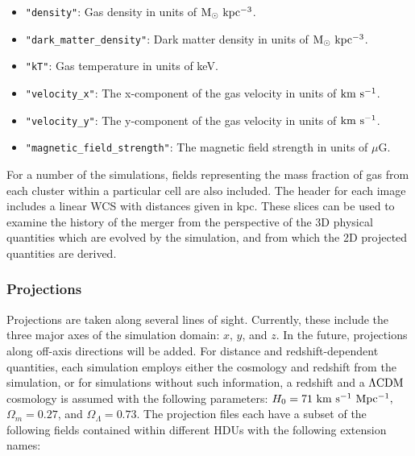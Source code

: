 \documentclass{emulateapj}
\newcommand{\code}[1]{\texttt{#1}}
\begin{document}
\begin{itemize}
\item \code{"density"}: Gas density in units of $\rm{M_\odot~kpc^{-3}}$.
\item \code{"dark\_matter\_density"}: Dark matter density in units of $\rm{M_\odot~kpc^{-3}}$.
\item \code{"kT"}: Gas temperature in units of keV.
\item \code{"velocity\_x"}: The x-component of the gas velocity in units of $\rm{km~s^{-1}}$.
\item \code{"velocity\_y"}: The y-component of the gas velocity in units of $\rm{km~s^{-1}}$.
\item \code{"magnetic\_field\_strength"}: The magnetic field strength in units of $\mu$G.
\end{itemize}

For a number of the simulations, fields representing the mass fraction of gas from each cluster within a particular cell are also included. The header for each image includes a linear WCS with distances given in kpc. These slices can be used to examine the history of the merger from the perspective of the 3D physical quantities which are evolved by the simulation, and from which the 2D projected quantities are derived.

\subsubsection{Projections}\label{sec:projections}

Projections are taken along several lines of sight. Currently, these include the three major axes of the simulation domain: $x$, $y$, and $z$. In the future, projections along off-axis directions will be added. For distance and redshift-dependent quantities, each simulation employs either the cosmology and redshift from the simulation, or for simulations without such information, a redshift and a $\Lambda{\rm CDM}$ cosmology is assumed with the following parameters: $H_0 = 71~{\rm km~s^{-1}~Mpc^{-1}},$ $\Omega_m = 0.27$, and $\Omega_\Lambda = 0.73$. The projection files each have a subset of the following fields contained within different HDUs with the following extension names:
\end{document}
